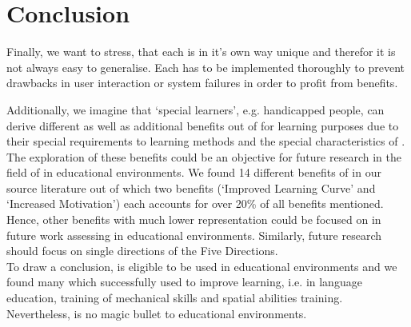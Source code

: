 \section{Conclusion}
\label{sec:Conclusion}
Finally, we want to stress, that each \AR \app is in it's own way unique and therefor it is not always easy to generalise. Each \app has to be implemented thoroughly to prevent drawbacks in user interaction or system failures in order to profit from benefits.

Additionally, we imagine that ‘special learners’, e.g. handicapped people, can derive different as well as additional benefits out of \AR \apps for learning purposes due to their special requirements to learning methods and the special characteristics of \ARns. The exploration of these benefits could be an objective for future research in the field of \AR \apps in educational environments.
We found 14 different benefits of \AR in our source literature out of which two benefits (‘Improved Learning Curve' and ‘Increased Motivation') each accounts for over 20\% of all benefits mentioned. Hence, other benefits with much lower representation could be focused on in future work assessing \AR \apps in educational environments. Similarly, future research should focus on single directions of the Five Directions.\\
To draw a conclusion, \AR is eligible to be used in educational environments and we found many \apps which successfully used \AR to improve learning, i.e. in language education, training of mechanical skills and spatial abilities training. Nevertheless, \AR is no magic bullet to educational environments.




